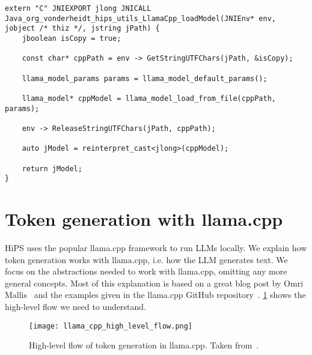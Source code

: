 \vspace{0.25cm}

\begin{lstlisting}[caption={[JNI: C++ side]{Example for the C++ side of the \gls{JNI}: Implementation of the function declared \lstinline|external| in Listing~\ref{lst:jniKotlin}.}}, label={lst:jniCpp}]
extern "C" JNIEXPORT jlong JNICALL Java_org_vonderheidt_hips_utils_LlamaCpp_loadModel(JNIEnv* env, jobject /* thiz */, jstring jPath) {
    jboolean isCopy = true;

    const char* cppPath = env -> GetStringUTFChars(jPath, &isCopy);

    llama_model_params params = llama_model_default_params();

    llama_model* cppModel = llama_model_load_from_file(cppPath, params);

    env -> ReleaseStringUTFChars(jPath, cppPath);

    auto jModel = reinterpret_cast<jlong>(cppModel);

    return jModel;
}
\end{lstlisting}

\section{Token generation with llama.cpp}
\label{sec:tokenGenerationWithLlamaCpp}
\gls{HiPS} uses the popular llama.cpp framework to run \glspl{LLM} locally. We explain how token generation works with llama.cpp, i.e. how the \gls{LLM} generates text. We focus on the abstractions needed to work with llama.cpp, omitting any more general concepts. Most of this explanation is based on a great blog post by Omri Mallis~\cite{mallisUnderstandingHowLLM2023} and the examples given in the llama.cpp GitHub repository~\cite{gerganovGgerganovLlamacpp2024}. \cref{fig:llamaCppHighLevelFlow} shows the high-level flow we need to understand.

\begin{figure}
    \begin{wide}
        \captionsetup{width=\linewidth}
        \texttt{[image: llama\_cpp\_high\_level\_flow.png]}
        \caption[llama.cpp: Token generation]{High-level flow of token generation in llama.cpp. Taken from~\cite{mallisUnderstandingHowLLM2023}.}
        \label{fig:llamaCppHighLevelFlow}
    \end{wide}
\end{figure}

